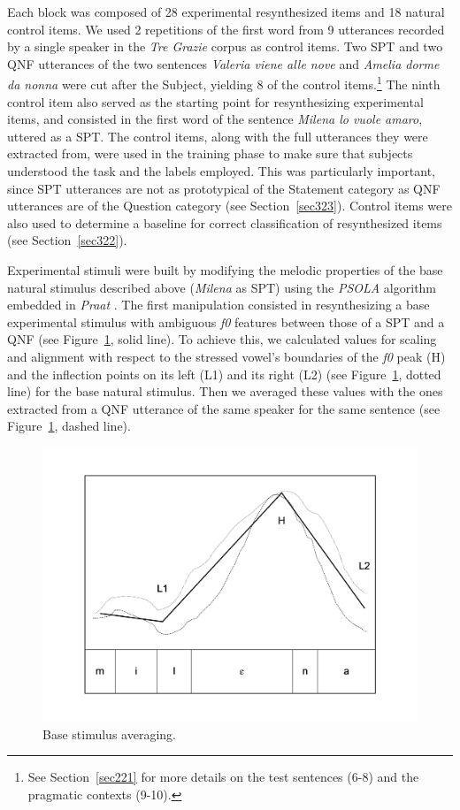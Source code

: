 Each block was composed of 28 experimental resynthesized items and 18 natural control items. We used 2 repetitions of the first word from 9 utterances recorded by a single speaker in the \textit{Tre Grazie} corpus as control items. Two SPT and two QNF utterances of the two sentences \textit{Valeria viene alle nove} and \textit{Amelia dorme da nonna} were cut after the Subject, yielding 8 of the control items.\footnote{See Section~\ref{sec221} for more details on the test sentences (6-8) and the pragmatic contexts (9-10).} The ninth control item also served as the starting point for resynthesizing experimental items, and consisted in the first word of the sentence \textit{Milena lo vuole amaro}, uttered as a SPT. The control items, along with the full utterances they were extracted from, were used in the training phase to make sure that subjects understood the task and the labels employed. This was particularly important, since SPT utterances are not as prototypical of the Statement category as QNF utterances are of the Question category (see Section~\ref{sec323}). Control items were also used to determine a baseline for correct classification of resynthesized items (see Section~\ref{sec322}). 

Experimental stimuli were built by modifying the melodic properties of the base natural stimulus described above (\textit{Milena} as SPT) using the \textit{PSOLA} algorithm \citep{moulines1990pitchsyncronous} embedded in \textit{Praat} \citep{boersma2008praat}. The first manipulation consisted in resynthesizing a base experimental stimulus with ambiguous \textit{f0} features between those of a SPT and a QNF (see Figure~\ref{fig303}, solid line). To achieve this, we calculated values for scaling and alignment with respect to the stressed vowel’s boundaries of the \textit{f0} peak (H) and the inflection points on its left (L1) and its right (L2) (see Figure~\ref{fig303}, dotted line) for the base natural stimulus. Then we averaged these values with the ones extracted from a QNF utterance of the same speaker for the same sentence (see Figure~\ref{fig303}, dashed line). 

\begin{figure}[p]
\centering
\includegraphics[height=.3\textheight]{images/303.png}
\caption{Base stimulus averaging.}
\label{fig303}\end{figure}


